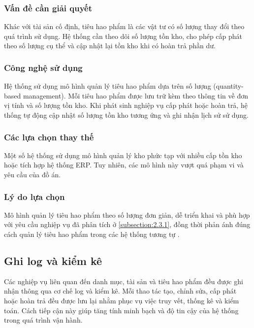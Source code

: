 \documentclass[../DoAn.tex]{subfiles}
\begin{document}
\subsubsection{Vấn đề cần giải quyết}

Khác với tài sản cố định, tiêu hao phẩm là các vật tư có số lượng thay đổi theo quá trình sử dụng. Hệ thống cần theo dõi số lượng tồn kho, cho phép cấp phát theo số lượng cụ thể và cập nhật lại tồn kho khi có hoàn trả phần dư.

\subsubsection{Công nghệ sử dụng}

Hệ thống sử dụng mô hình quản lý tiêu hao phẩm dựa trên số lượng (quantity-based management). Mỗi tiêu hao phẩm được lưu trữ kèm theo thông tin về đơn vị tính và số lượng tồn kho. Khi phát sinh nghiệp vụ cấp phát hoặc hoàn trả, hệ thống tự động cập nhật số lượng tồn kho tương ứng và ghi nhận lịch sử sử dụng.

\subsubsection{Các lựa chọn thay thế}

Một số hệ thống sử dụng mô hình quản lý kho phức tạp với nhiều cấp tồn kho hoặc tích hợp hệ thống ERP. Tuy nhiên, các mô hình này vượt quá phạm vi và yêu cầu của đồ án.

\subsubsection{Lý do lựa chọn}

Mô hình quản lý tiêu hao phẩm theo số lượng đơn giản, dễ triển khai và phù hợp với yêu cầu nghiệp vụ đã phân tích ở \autoref{subsection:2.3.1}, đồng thời phản ánh đúng cách quản lý tiêu hao phẩm trong các hệ thống tương tự .

\subsection{Ghi log và kiểm kê}

Các nghiệp vụ liên quan đến danh mục, tài sản và tiêu hao phẩm đều được ghi nhận thông qua cơ chế log và kiểm kê. Mỗi thao tác tạo, chỉnh sửa, cấp phát hoặc hoàn trả đều được lưu lại nhằm phục vụ việc truy vết, thống kê và kiểm toán. Cách tiếp cận này giúp tăng tính minh bạch và độ tin cậy của hệ thống trong quá trình vận hành.
\end{document}
